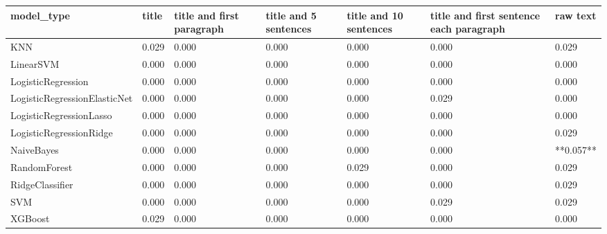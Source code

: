 \begin{tabular}{lllllll}
\toprule
                  model\_type & title & title and first paragraph & title and 5 sentences & title and 10 sentences & title and first sentence each paragraph &  raw text \\
\midrule
                         KNN & 0.029 &                     0.000 &                 0.000 &                  0.000 &                                   0.000 &     0.029 \\
                   LinearSVM & 0.000 &                     0.000 &                 0.000 &                  0.000 &                                   0.000 &     0.000 \\
          LogisticRegression & 0.000 &                     0.000 &                 0.000 &                  0.000 &                                   0.000 &     0.000 \\
LogisticRegressionElasticNet & 0.000 &                     0.000 &                 0.000 &                  0.000 &                                   0.029 &     0.000 \\
     LogisticRegressionLasso & 0.000 &                     0.000 &                 0.000 &                  0.000 &                                   0.000 &     0.000 \\
     LogisticRegressionRidge & 0.000 &                     0.000 &                 0.000 &                  0.000 &                                   0.000 &     0.029 \\
                  NaiveBayes & 0.000 &                     0.000 &                 0.000 &                  0.000 &                                   0.000 & **0.057** \\
                RandomForest & 0.000 &                     0.000 &                 0.000 &                  0.029 &                                   0.000 &     0.029 \\
             RidgeClassifier & 0.000 &                     0.000 &                 0.000 &                  0.000 &                                   0.000 &     0.029 \\
                         SVM & 0.000 &                     0.000 &                 0.000 &                  0.000 &                                   0.029 &     0.029 \\
                     XGBoost & 0.029 &                     0.000 &                 0.000 &                  0.000 &                                   0.000 &     0.000 \\
\bottomrule
\end{tabular}

